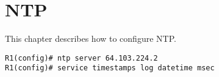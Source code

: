 \section{NTP}
This chapter describes how to configure NTP.
\begin{verbatim}
R1(config)# ntp server 64.103.224.2
R1(config)# service timestamps log datetime msec
\end{verbatim}
